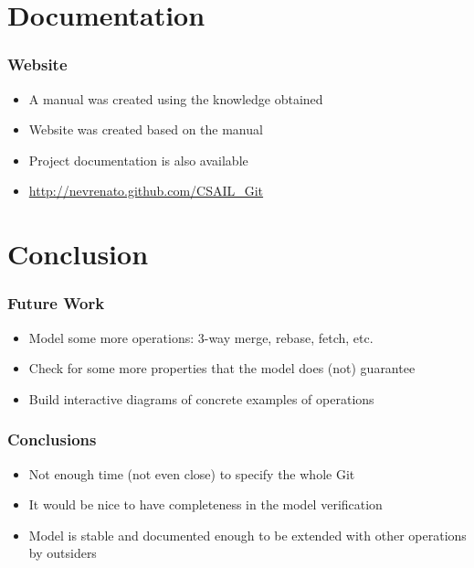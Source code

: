 \documentclass{beamer}
\begin{document}
\section{Documentation}

\begin{frame}
	\frametitle{Website}
	\begin{itemize}
	\item A manual was created using the knowledge obtained
	\item Website was created based on the manual 
	\item Project documentation is also available
	\item \url{http://nevrenato.github.com/CSAIL\_Git}
	\end{itemize}

\end{frame}

\section{Conclusion}

\begin{frame}
	\frametitle{Future Work}
	\begin{itemize}
	\item Model some more operations: 3-way merge, rebase, fetch, etc. 
	\item Check for some more properties that the model does (not) guarantee
	\item Build interactive diagrams of concrete examples of operations 
	\end{itemize}
\end{frame}

\begin{frame}
	\frametitle{Conclusions}
	\begin{itemize}
	\item Not enough time (not even close) to specify the whole Git
	\item It would be nice to have completeness in the model verification
	\item Model is stable and documented enough to be extended with other operations by outsiders
	\end{itemize}
\end{frame}
\end{document}
